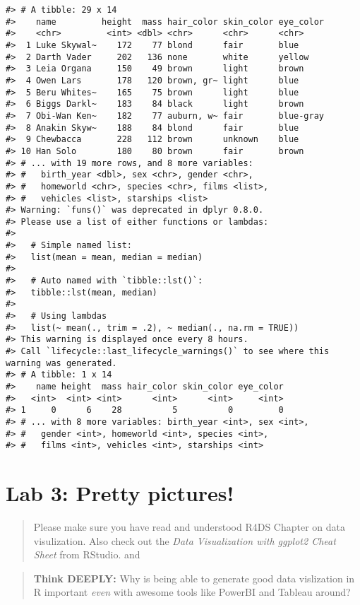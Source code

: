 \documentclass[
]{book}
\begin{document}
\begin{verbatim}
#> # A tibble: 29 x 14
#>    name         height  mass hair_color skin_color eye_color
#>    <chr>         <int> <dbl> <chr>      <chr>      <chr>    
#>  1 Luke Skywal~    172    77 blond      fair       blue     
#>  2 Darth Vader     202   136 none       white      yellow   
#>  3 Leia Organa     150    49 brown      light      brown    
#>  4 Owen Lars       178   120 brown, gr~ light      blue     
#>  5 Beru Whites~    165    75 brown      light      blue     
#>  6 Biggs Darkl~    183    84 black      light      brown    
#>  7 Obi-Wan Ken~    182    77 auburn, w~ fair       blue-gray
#>  8 Anakin Skyw~    188    84 blond      fair       blue     
#>  9 Chewbacca       228   112 brown      unknown    blue     
#> 10 Han Solo        180    80 brown      fair       brown    
#> # ... with 19 more rows, and 8 more variables:
#> #   birth_year <dbl>, sex <chr>, gender <chr>,
#> #   homeworld <chr>, species <chr>, films <list>,
#> #   vehicles <list>, starships <list>
#> Warning: `funs()` was deprecated in dplyr 0.8.0.
#> Please use a list of either functions or lambdas: 
#> 
#>   # Simple named list: 
#>   list(mean = mean, median = median)
#> 
#>   # Auto named with `tibble::lst()`: 
#>   tibble::lst(mean, median)
#> 
#>   # Using lambdas
#>   list(~ mean(., trim = .2), ~ median(., na.rm = TRUE))
#> This warning is displayed once every 8 hours.
#> Call `lifecycle::last_lifecycle_warnings()` to see where this warning was generated.
#> # A tibble: 1 x 14
#>    name height  mass hair_color skin_color eye_color
#>   <int>  <int> <int>      <int>      <int>     <int>
#> 1     0      6    28          5          0         0
#> # ... with 8 more variables: birth_year <int>, sex <int>,
#> #   gender <int>, homeworld <int>, species <int>,
#> #   films <int>, vehicles <int>, starships <int>
\end{verbatim}

\hypertarget{lab-3-pretty-pictures}{%
\chapter{Lab 3: Pretty pictures!}\label{lab-3-pretty-pictures}}

\begin{quote}
Please make sure you have read and understood R4DS Chapter
on data visulization. Also check out the \emph{Data
Visualization with ggplot2 Cheat Sheet} from RStudio.
and
\end{quote}

\begin{quote}
\textbf{Think DEEPLY:} Why is being able to generate good data vislization in R important \emph{even} with awesome tools like PowerBI and Tableau around?
\end{quote}
\end{document}
